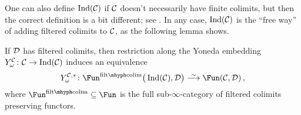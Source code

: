 \documentclass[a4paper, 10pt, oneside, DIV=9, chapterprefix=true, numbers=enddot,bibliography=totoc]{scrbook}
\newcommand\Yo{Y}%
\begin{document}
One can also define $\operatorname{Ind}(\mathcal{C})$ if $\mathcal{C}$ doesn't necessarily have finite colimits, but then the correct definition is a bit different; see \cite[Definition~]{HTT}. In any case, $\operatorname{Ind}(\mathcal{C})$ is the \enquote{free way} of adding filtered colimits to $\mathcal{C}$, as the following lemma shows.
\begin{smalllem}\label{lem:IndUniversalProperty}
	If $\mathcal{D}$ has filtered colimits, then restriction along the Yoneda embedding $\Yo_{\omega}^\Cc\colon \Cc\morphism\operatorname{Ind}(\Cc)$ induces an equivalence
	\begin{equation*}
		\Yo_\omega^{\Cc,*}\colon\Fun^{\mathrm{filt}\mhyph\mathrm{colim}}\big(\operatorname{Ind}(\Cc),\Dd\big)\isomorphism \Fun(\Cc,\Dd)\,,
	\end{equation*}
	where $\Fun^{\mathrm{filt}\mhyph\mathrm{colim}}\subseteq \Fun$ is the full sub-$\infty$-category of filtered colimits preserving functors.
\end{smalllem}
\end{document}

